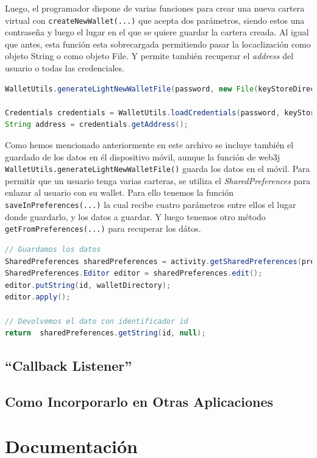 Luego, el programador dispone de varias funciones para crear una nueva cartera virtual con \verb|createNewWallet(...)| que acepta dos parámetros, siendo estos una contraseña y luego el lugar en el que se quiere guardar la cartera creada. Al igual que antes, esta función esta sobrecargada permitiendo pasar la locaclización como objeto String o como objeto File. Y permite también recuperar el \emph{address} del usuario o todas las credenciales. 

\begin{lstlisting}[language=Java,float=ht,caption={[Java] Creacion de wallet y recuperación del address},label=lst:transactionHelper]
WalletUtils.generateLightNewWalletFile(password, new File(keyStoreDirectory));

Credentials credentials = WalletUtils.loadCredentials(password, keyStoreDirectory);
String address = credentials.getAddress();
\end{lstlisting}

Como hemos mencionado anteriormente en este archivo se incluye también el guardado de los datos en él dispositivo móvil, aunque la función de web3j \verb|WalletUtils.generateLightNewWalletFile()| guarda los datos en el móvil. Para permitir que un usuario tenga varias carteras, se utiliza el \emph{SharedPreferences} para enlazar al usuario con su wallet. Para ello tenemos la función \verb|saveInPreferences(...)| la cual recibe cuatro parámetros entre ellos el lugar donde guardarlo, y los datos a guardar. Y luego tenemos otro método \verb|getFromPreferences(...)| para recuperar los dátos. 

\begin{lstlisting}[language=Java,float=ht,caption={[Java] Guardado y recuperación de dátos en SharedPreferences},label=lst:transactionHelper]
// Guardamos los datos
SharedPreferences sharedPreferences = activity.getSharedPreferences(prefsName, Context.MODE_PRIVATE);
SharedPreferences.Editor editor = sharedPreferences.edit();
editor.putString(id, walletDirectory);
editor.apply();

// Devolvemos el dato con identificador id
return  sharedPreferences.getString(id, null);
\end{lstlisting}

\subsection{``Callback Listener''}

\subsection{Como Incorporarlo en Otras Aplicaciones} \label{sec:Maven}



\section{Documentación}



